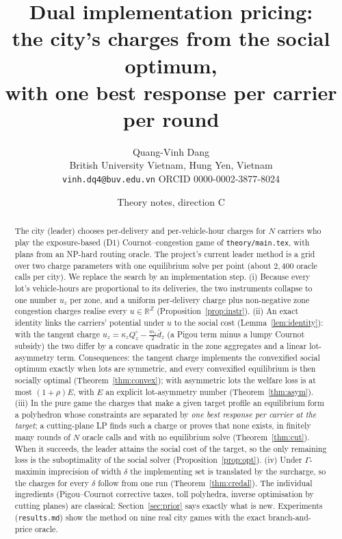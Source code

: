 \documentclass[11pt]{article}
\title{Dual implementation pricing:\\ the city's charges from the social optimum,\\ with one best response per carrier per round}
\author{Quang-Vinh Dang\\ British University Vietnam, Hung Yen, Vietnam\\ \texttt{vinh.dq4@buv.edu.vn} \quad ORCID 0000-0002-3877-8024}
\date{Theory notes, direction C}
\theoremstyle{definition}
\theoremstyle{remark}
\newcommand{\R}{\mathbb{R}}
\newcommand{\dbar}{\bar d}
\begin{document}
\maketitle

\begin{abstract}
The city (leader) chooses per-delivery and per-vehicle-hour charges for $N$ carriers who play the exposure-based (D1) Cournot--congestion game of \texttt{theory/main.tex}, with plans from an NP-hard routing oracle. The project's current leader method is a grid over two charge parameters with one equilibrium solve per point (about $2{,}400$ oracle calls per city). We replace the search by an implementation step. (i) Because every lot's vehicle-hours are proportional to its deliveries, the two instruments collapse to one number $u_z$ per zone, and a uniform per-delivery charge plus non-negative zone congestion charges realise every $u\in\R^Z$ (Proposition~\ref{prop:instr}). (ii) An exact identity links the carriers' potential under $u$ to the social cost (Lemma~\ref{lem:identity}): with the tangent charge $u_z=\kappa_zQ^\circ_z-\tfrac{m_z}{2}\dbar_z$ (a Pigou term minus a lumpy Cournot subsidy) the two differ by a concave quadratic in the zone aggregates and a linear lot-asymmetry term. Consequences: the tangent charge implements the convexified social optimum exactly when lots are symmetric, and every convexified equilibrium is then socially optimal (Theorem~\ref{thm:convex}); with asymmetric lots the welfare loss is at most $(1+\rho)E$, with $E$ an explicit lot-asymmetry number (Theorem~\ref{thm:asym}). (iii) In the pure game the charges that make a given target profile an equilibrium form a polyhedron whose constraints are separated by \emph{one best response per carrier at the target}; a cutting-plane LP finds such a charge or proves that none exists, in finitely many rounds of $N$ oracle calls and with no equilibrium solve (Theorem~\ref{thm:cut}). When it succeeds, the leader attains the social cost of the target, so the only remaining loss is the suboptimality of the social solver (Proposition~\ref{prop:opt}). (iv) Under $\Gamma$-maximin imprecision of width $\delta$ the implementing set is translated by the surcharge, so the charges for every $\delta$ follow from one run (Theorem~\ref{thm:credal}). The individual ingredients (Pigou--Cournot corrective taxes, toll polyhedra, inverse optimisation by cutting planes) are classical; Section~\ref{sec:prior} says exactly what is new. Experiments (\texttt{results.md}) show the method on nine real city games with the exact branch-and-price oracle.
\end{abstract}
\end{document}
